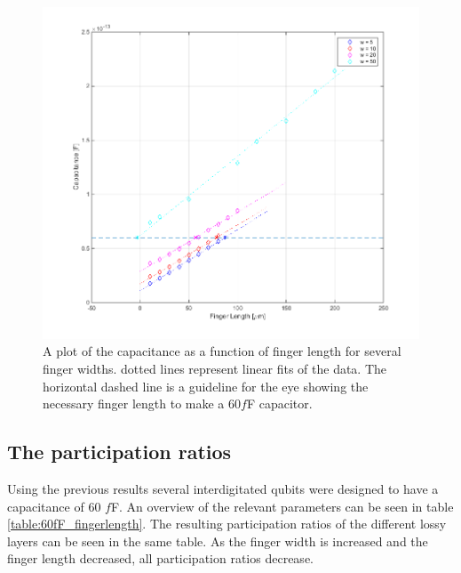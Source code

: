 \begin{figure}
	\centering
	\includegraphics[width = \textwidth]{Figures/Capacitances_g5_50}
	\caption{A plot of the capacitance as a function of finger length for several finger widths. dotted lines represent linear fits of the data. The horizontal dashed line is a guideline for the eye showing the necessary finger length to make a 60\(f\)F capacitor.}
	\label{fig:Capacitances_g5_50}
\end{figure}

\subsection{The participation ratios}
Using the previous results several interdigitated qubits were designed to have a capacitance of 60 \(f\)F. An overview of the relevant parameters can be seen in table \ref{table:60fF_fingerlength}. The resulting participation ratios of the different lossy layers can be seen in the same table. As the finger width is increased and the finger length decreased, all participation ratios decrease. 

